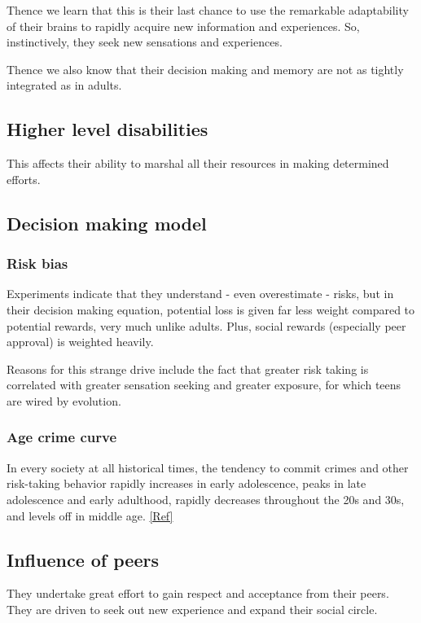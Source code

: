 \documentclass[oneside, article]{memoir}
\begin{document}
Thence we learn that this is their last chance to use the remarkable adaptability of their brains to rapidly acquire new information and experiences. So, instinctively, they seek new sensations and experiences.

Thence we also know that their decision making and memory are not as tightly integrated as in adults.

\subsection{Higher level disabilities}
This affects their ability to marshal all their resources in making determined efforts.

\subsection{Decision making model}
\subsubsection{Risk bias}
Experiments indicate that they understand - even overestimate - risks, but in their decision making equation, potential loss is given far less weight compared to potential rewards, very much unlike adults. Plus, social rewards (especially peer approval) is weighted heavily.

Reasons for this strange drive include the fact that greater risk taking is correlated with greater sensation seeking and greater exposure, for which teens are wired by evolution.

\subsubsection{Age crime curve}
In every society at all historical times, the tendency to commit crimes and other risk-taking behavior rapidly increases in early adolescence, peaks in late adolescence and early adulthood, rapidly decreases throughout the 20s and 30s, and levels off in middle age. \href{http://www.psychologytoday.com/articles/pto-20070622-000002.xml}{[Ref]}

\subsection{Influence of peers}
They undertake great effort to gain respect and acceptance from their peers. They are driven to seek out new experience and expand their social circle. 
\end{document}
